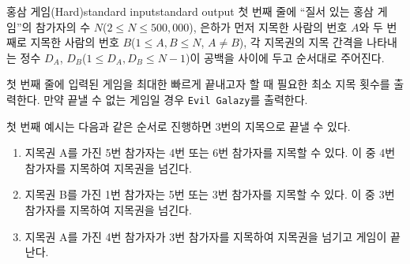 \begin{problem}{홍삼 게임(Hard)}{standard input}{standard output}
\InputFile
첫 번째 줄에 ``질서 있는 홍삼 게임''의 참가자의 수 $N$($2 \le N \le 500,000$), 은하가 먼저 지목한 사람의 번호 $A$와 두 번째로 지목한 사람의 번호 $B$($1 \le A, B \le N$, $A \neq B$), 각 지목권의 지목 간격을 나타내는 정수 $D_{A}$, $D_{B}$($1 \le D_{A}, D_{B} \le N-1$)이 공백을 사이에 두고 순서대로 주어진다.

\OutputFile
첫 번째 줄에 입력된 게임을 최대한 빠르게 끝내고자 할 때 필요한 최소 지목 횟수를 출력한다. 만약 끝낼 수 없는 게임일 경우 \texttt{Evil Galazy}를 출력한다.

\Example

\begin{example}
%
%
\end{example}

\Notes

첫 번째 예시는 다음과 같은 순서로 진행하면 3번의 지목으로 끝낼 수 있다.

\begin{enumerate}
\item{지목권 A를 가진 5번 참가자는 4번 또는 6번 참가자를 지목할 수 있다. 이 중 4번 참가자를 지목하여 지목권을 넘긴다.}
\item{지목권 B를 가진 1번 참가자는 5번 또는 3번 참가자를 지목할 수 있다. 이 중 3번 참가자를 지목하여 지목권을 넘긴다.}
\item{지목권 A를 가진 4번 참가자가 3번 참가자를 지목하여 지목권을 넘기고 게임이 끝난다.}
\end{enumerate}

\end{problem}
